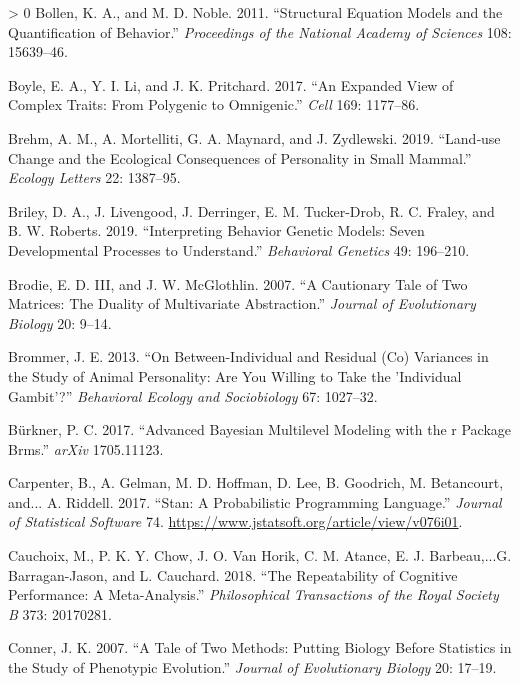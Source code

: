 \documentclass{article}
\newlength{\cslhangindent}
\newenvironment{CSLReferences}[3] %
 {%
  \setlength{\parindent}{0pt}
  \ifodd #1 \everypar{\setlength{\hangindent}{\cslhangindent}}\ignorespaces\fi
  \ifnum #2 > 0
  \setlength{\parskip}{#2\baselineskip}
  \fi
 }%
 {}
\begin{document}
\begin{CSLReferences}{1}{0}
\leavevmode\hypertarget{ref-Bollen2011}{}%
Bollen, K. A., and M. D. Noble. 2011. {``Structural Equation Models and
the Quantification of Behavior.''} \emph{Proceedings of the National
Academy of Sciences} 108: 15639--46.

\leavevmode\hypertarget{ref-Boyle2017}{}%
Boyle, E. A., Y. I. Li, and J. K. Pritchard. 2017. {``An Expanded View
of Complex Traits: From Polygenic to Omnigenic.''} \emph{Cell} 169:
1177--86.

\leavevmode\hypertarget{ref-Brehm2019}{}%
Brehm, A. M., A. Mortelliti, G. A. Maynard, and J. Zydlewski. 2019.
{``Land‐use Change and the Ecological Consequences of Personality in
Small Mammal.''} \emph{Ecology Letters} 22: 1387--95.

\leavevmode\hypertarget{ref-Briley2019}{}%
Briley, D. A., J. Livengood, J. Derringer, E. M. Tucker-Drob, R. C.
Fraley, and B. W. Roberts. 2019. {``Interpreting Behavior Genetic
Models: Seven Developmental Processes to Understand.''} \emph{Behavioral
Genetics} 49: 196--210.

\leavevmode\hypertarget{ref-Brodie2007}{}%
Brodie, E. D. III, and J. W. McGlothlin. 2007. {``A Cautionary Tale of
Two Matrices: The Duality of Multivariate Abstraction.''} \emph{Journal
of Evolutionary Biology} 20: 9--14.

\leavevmode\hypertarget{ref-Brommer2013}{}%
Brommer, J. E. 2013. {``On Between-Individual and Residual (Co)
Variances in the Study of Animal Personality: Are You Willing to Take
the 'Individual Gambit'?''} \emph{Behavioral Ecology and Sociobiology}
67: 1027--32.

\leavevmode\hypertarget{ref-brms2017}{}%
Bürkner, P. C. 2017. {``Advanced Bayesian Multilevel Modeling with the r
Package Brms.''} \emph{arXiv} 1705.11123.

\leavevmode\hypertarget{ref-Stan}{}%
Carpenter, B., A. Gelman, M. D. Hoffman, D. Lee, B. Goodrich, M.
Betancourt, and... A. Riddell. 2017. {``Stan: A Probabilistic
Programming Language.''} \emph{Journal of Statistical Software} 74.
\url{https://www.jstatsoft.org/article/view/v076i01}.

\leavevmode\hypertarget{ref-Cauch2018}{}%
Cauchoix, M., P. K. Y. Chow, J. O. Van Horik, C. M. Atance, E. J.
Barbeau,...G. Barragan-Jason, and L. Cauchard. 2018. {``The
Repeatability of Cognitive Performance: A Meta-Analysis.''}
\emph{Philosophical Transactions of the Royal Society B} 373: 20170281.

\leavevmode\hypertarget{ref-Conner2007}{}%
Conner, J. K. 2007. {``A Tale of Two Methods: Putting Biology Before
Statistics in the Study of Phenotypic Evolution.''} \emph{Journal of
Evolutionary Biology} 20: 17--19.


\end{CSLReferences}
\end{document}
